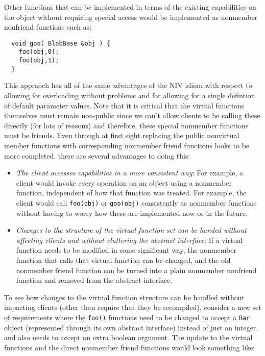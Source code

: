 \documentclass[pdf,ps2pdf,11pt]{SANDreport}
\begin{document}
Other functions that can be implemented in terms of the existing capabilities
on the object without requiring special access would be implemented as
nonmember nonfriend functions such as:

{\small\begin{verbatim}
  void goo( BlobBase &obj ) {
    foo(obj,0);
    foo(obj,1);
  }
\end{verbatim}}

This appraoch has all of the same advantages of the NIV idiom with respect to
allowing for overloading without problems and for allowing for a single
defintion of default parameter values.  Note that it is critical that the
virtual functions themselves must remain non-public since we can't allow
clients to be calling these directly (for lots of reasons) and therefore,
these special nonmember functions must be friends.  Even through at first
sight replacing the public nonvirtual member functions with corresponding
nonmember friend functions looks to be more completed, there are several
advantages to doing this:

\begin{itemize}

{}\item\textit{The client accesses capabilities in a more consistent way}: For
example, a client would invoke every operation on an object using a nonmember
function, independent of how that function was treated.  For example, the
client would call {}\texttt{foo(obj)} or {}\texttt{goo(obj)} consistently as
nonmember functions without having to worry how these are implemented now or
in the future.

{}\item\textit{Changes to the structure of the virtual function set can be
handed without affecting clients and without cluttering the abstract
interface}: If a virtual function needs to be modified in some significant
way, the nonmember function that calls that virtual function can be changed,
and the old nonmember friend function can be turned into a plain nonmember
nonfriend function and removed from the abstract interface.

\end{itemize}

To see how changes to the virtual function structure can be handled without
impacting clients (other than require that they be recompiled), consider a new
set of requirements where the {}\texttt{foo()} functions need to be changed to
accept a {}\texttt{Bar} object (represented through its own abstract
interface) instead of just an integer, and also needs to accept an extra
boolean argument.  The update to the virtual functions and the direct
nonmember friend functions would look something like:
\end{document}
